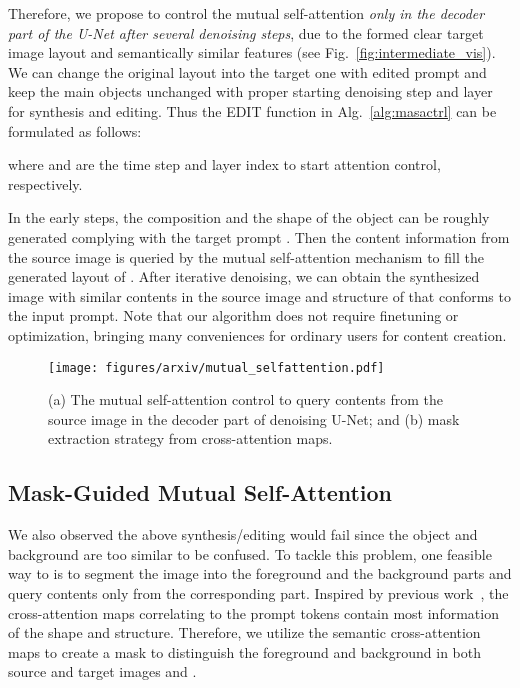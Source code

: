 \documentclass[10pt,twocolumn,letterpaper]{article}
\begin{document}
Therefore, we propose to control the mutual self-attention \textit{only in the decoder part of the U-Net after several denoising steps}, due to the formed clear target image layout and semantically similar features (see Fig.~\ref{fig:intermediate_vis}). We can change the original layout into the target one with edited prompt  and keep the main objects unchanged with proper starting denoising step  and layer  for synthesis and editing. Thus the EDIT function in Alg.~\ref{alg:masactrl} can be formulated as follows:

where  and  are the time step and layer index to start attention control, respectively. 

In the early steps, the composition and the shape of the object can be roughly generated complying with the target prompt . Then the content information from the source image  is queried by the mutual self-attention mechanism to fill the generated layout of . After iterative denoising, we can obtain the synthesized image with similar contents in the source image and structure of  that conforms to the input prompt. Note that our algorithm does not require finetuning or optimization, bringing many conveniences for ordinary users for content creation.

\begin{figure}[t]
    \centering
    \texttt{[image: figures/arxiv/mutual\_selfattention.pdf]}
    \caption{(a) The mutual self-attention control to query contents from the source image in the decoder part of denoising U-Net; and (b) mask extraction strategy from cross-attention maps.}
    \label{fig:mutual_selfattention}
\end{figure}

\subsection{Mask-Guided Mutual Self-Attention} \label{sec:mask-guided}
We also observed the above synthesis/editing would fail since the object and background are too similar to be confused. 
To tackle this problem, one feasible way to is to segment the image into the foreground and the background parts and query contents only from the corresponding part. 
Inspired by previous work~\cite{hertz2022prompt, tang2022daam}, the cross-attention maps correlating to the prompt tokens contain most information of the shape and structure. 
Therefore, we utilize the semantic cross-attention maps to create a mask to distinguish the foreground and background in both source and target images  and . 
\end{document}
